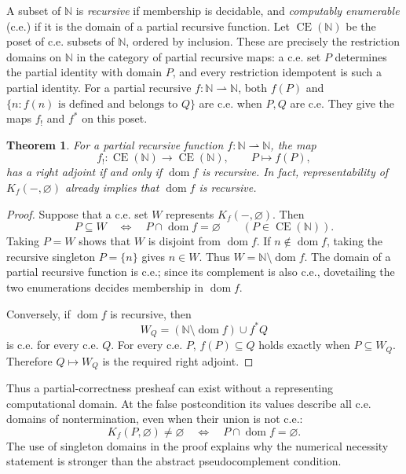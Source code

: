 \documentclass[11pt]{article}
\newtheorem{theorem}{Theorem}[section]
\theoremstyle{definition}
\theoremstyle{remark}
\newcommand{\CE}{\operatorname{CE}}
\newcommand{\N}{\mathbb N}
\begin{document}
A subset of $\N$ is \emph{recursive} if membership is decidable, and
\emph{computably enumerable} (c.e.) if it is the domain of a partial
recursive function. Let $\CE(\N)$ be the poset of c.e. subsets of
$\N$, ordered by inclusion. These are precisely the restriction
domains on $\N$ in the category of partial recursive maps: a c.e.
set $P$ determines the partial identity with domain $P$, and every
restriction idempotent is such a partial identity. For a partial
recursive $f:\N\rightharpoonup\N$, both $f(P)$ and
$\{n:f(n)\text{ is defined and belongs to }Q\}$ are c.e. when
$P,Q$ are c.e. They give the maps $f_!$ and $f^*$ on this poset.

\begin{theorem}\label{hp:numerical-wlp}
For a partial recursive function $f:\N\rightharpoonup\N$, the map
\[
 f_!:\CE(\N)\longrightarrow\CE(\N),\qquad P\longmapsto f(P),
\]
has a right adjoint if and only if $\operatorname{dom}f$ is recursive.
In fact, representability of $K_f(-,\varnothing)$ already implies that
$\operatorname{dom}f$ is recursive.
\end{theorem}
\begin{proof}
Suppose that a c.e. set $W$ represents $K_f(-,\varnothing)$. Then
\[
 P\subseteq W\quad\Longleftrightarrow\quad
 P\cap\operatorname{dom}f=\varnothing
 \qquad(P\in\CE(\N)).
\]
Taking $P=W$ shows that $W$ is disjoint from $\operatorname{dom}f$.
If $n\notin\operatorname{dom}f$, taking the recursive singleton
$P=\{n\}$ gives $n\in W$. Thus
$W=\N\setminus\operatorname{dom}f$. The domain of a partial recursive
function is c.e.; since its complement is also c.e., dovetailing the two
enumerations decides membership in $\operatorname{dom}f$.

Conversely, if $\operatorname{dom}f$ is recursive, then
\[
 W_Q=(\N\setminus\operatorname{dom}f)\cup f^*Q
\]
is c.e. for every c.e. $Q$. For every c.e. $P$,
$f(P)\subseteq Q$ holds exactly when $P\subseteq W_Q$.
Therefore $Q\mapsto W_Q$ is the required right adjoint.
\end{proof}

Thus a partial-correctness presheaf can exist without a representing
computational domain. At the false postcondition its values describe
all c.e. domains of nontermination, even when their union is not c.e.:
\[
 K_f(P,\varnothing)\ne\varnothing
 \quad\Longleftrightarrow\quad P\cap\operatorname{dom}f=\varnothing.
\]
The use of singleton domains in the proof explains why the numerical
necessity statement is stronger than the abstract pseudocomplement
condition.
\end{document}
